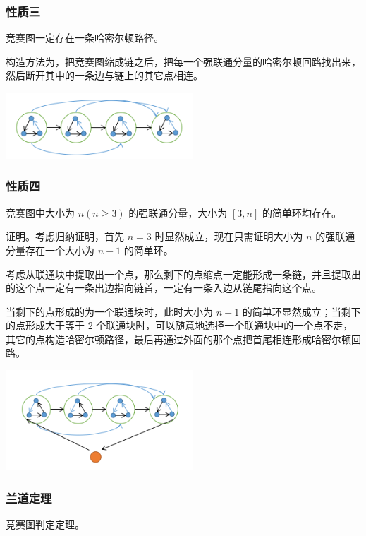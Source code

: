 \documentclass[UTF-8]{ctexart}
\begin{document}
	\subsubsection{性质三}
	竞赛图一定存在一条哈密尔顿路径。
	
	构造方法为，把竞赛图缩成链之后，把每一个强联通分量的哈密尔顿回路找出来，然后断开其中的一条边与链上的其它点相连。
	
	\begin{center}
		\includegraphics[width=7cm]{file//hamiltonian2.png}
	\end{center}
	
	\subsubsection{性质四}
	竞赛图中大小为 $n(n\ge3)$ 的强联通分量，大小为 $[3,n]$ 的简单环均存在。
	
	证明。考虑归纳证明，首先 $n=3$ 时显然成立，现在只需证明大小为 $n$ 的强联通分量存在一个大小为 $n-1$ 的简单环。
	
	考虑从联通块中提取出一个点，那么剩下的点缩点一定能形成一条链，并且提取出的这个点一定有一条出边指向链首，一定有一条入边从链尾指向这个点。
	
	当剩下的点形成的为一个联通块时，此时大小为 $n-1$ 的简单环显然成立；当剩下的点形成大于等于 $2$ 个联通块时，可以随意地选择一个联通块中的一个点不走，其它的点构造哈密尔顿路径，最后再通过外面的那个点把首尾相连形成哈密尔顿回路。
	
	\begin{center}
		\includegraphics[width=7cm]{file//hamiltonian3.png}
	\end{center}
	
	\subsubsection{兰道定理}
	竞赛图判定定理。
	
\end{document}
